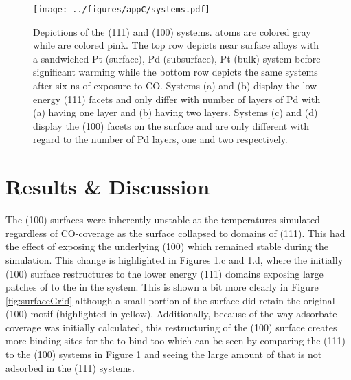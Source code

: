 \begin{landscape}
\begin{figure}[p!]
\centering
  \texttt{[image: ../figures/appC/systems.pdf]}
  \caption{Depictions of the (111) and (100) systems.  atoms are colored
gray while  are colored pink. The top row depicts near surface alloys
with a sandwiched Pt (surface), Pd (subsurface), Pt (bulk) system before
significant warming while the bottom row depicts the same systems after six ns of
exposure to CO. Systems (a) and (b) display the low-energy (111) facets and
only differ with number of layers of Pd with (a) having one layer and (b)
having two layers. Systems (c) and (d) display the (100) facets on the surface
and are only different with regard to the number of Pd layers, one and two
respectively.}
\label{fig:biSystems}
\end{figure}
\end{landscape}

\section{Results \& Discussion}
The (100)  surfaces were inherently unstable at the temperatures
simulated regardless of CO-coverage as the surface  collapsed to domains
of (111). This had the effect of exposing the underlying (100)  which
remained stable during the simulation. This change is highlighted in Figures
\ref{fig:biSystems}.c and \ref{fig:biSystems}.d, where the initially (100)
surface restructures to the lower energy (111) domains exposing large patches
of  to the  in the system. This is shown a bit more clearly in
Figure \ref{fig:surfaceGrid} although a small portion of the surface did retain
the original (100) motif (highlighted in yellow). Additionally, because of the
way adsorbate coverage was initially calculated, this restructuring of the
(100) surface creates more binding sites for the  to bind too which can
be seen by comparing the (111) to the (100) systems in Figure
\ref{fig:biSystems} and seeing the large amount of  that is not adsorbed
in the (111) systems.

